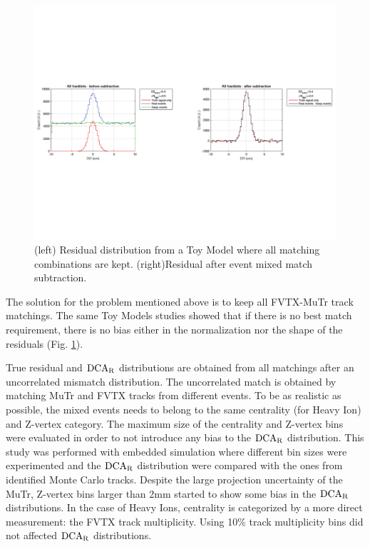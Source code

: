 \documentclass[12pt]{article}
\newcommand{\dcar}{$\rm{DCA}_{R}$ }
\begin{document}
\begin{figure}[!htb]
	\includegraphics[width=1.0\textwidth]{Figures/swapp_bias_combinatorics}
	\caption{\label{fig:toy_model_match_nobias} (left) Residual distribution from a Toy Model where all matching combinations are kept. (right)Residual after event mixed match subtraction.}
\end{figure}

The solution for the problem mentioned above is to keep all FVTX-MuTr track matchings. The same Toy Models studies showed that if there is 
no best match requirement, there is no bias either in the normalization nor the shape of the residuals (Fig. \ref{fig:toy_model_match_nobias}).

True residual and \dcar distributions are obtained from all matchings after an uncorrelated mismatch distribution. The uncorrelated match is 
obtained by matching MuTr and FVTX tracks from different events. To be as realistic as possible, the mixed events needs to belong to the same 
centrality (for Heavy Ion) and Z-vertex category. The maximum size of the centrality and Z-vertex bins were evaluated in order to not introduce 
any bias to the \dcar distribution. This study was performed with embedded simulation where different bin sizes were experimented and the \dcar 
distribution were compared with the ones from identified Monte Carlo tracks. Despite the large projection uncertainty of the MuTr, Z-vertex bins 
larger than 2mm started to show some bias in the \dcar distributions. In the case of Heavy Ions, centrality is categorized by a more direct 
measurement: the FVTX track multiplicity. Using 10\% track multiplicity bins did not affected \dcar distributions. 
\end{document}
